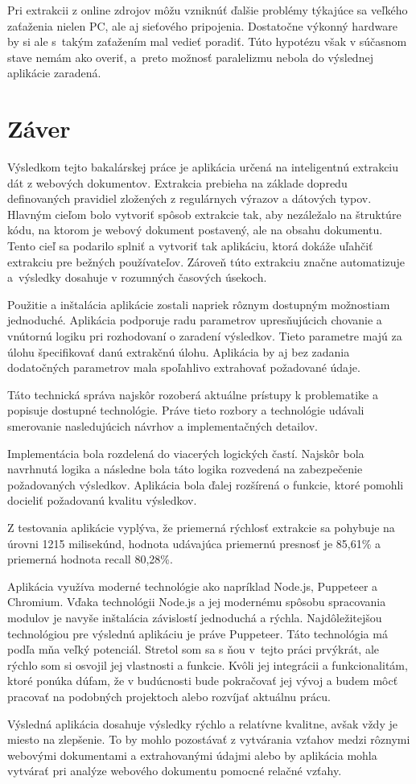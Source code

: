 Pri extrakcii z online zdrojov môžu vzniknúť ďalšie problémy týkajúce sa veľkého zaťaženia nielen PC, ale aj sieťového pripojenia. Dostatočne výkonný hardware by si ale s~takým zaťažením mal vedieť poradiť. Túto hypotézu však v súčasnom stave nemám ako overiť, a~preto možnosť paralelizmu nebola do výslednej aplikácie zaradená.


\chapter{Záver}

Výsledkom tejto bakalárskej práce je aplikácia určená na inteligentnú extrakciu dát z webových dokumentov. Extrakcia prebieha na základe dopredu definovaných pravidiel zložených z regulárnych výrazov a dátových typov. Hlavným cieľom bolo vytvoriť spôsob extrakcie tak, aby nezáležalo na štruktúre kódu, na ktorom je webový dokument postavený, ale na obsahu dokumentu. Tento cieľ sa podarilo splniť a vytvoriť tak aplikáciu, ktorá dokáže uľahčiť extrakciu pre bežných používateľov. Zároveň túto extrakciu značne automatizuje a~výsledky dosahuje v rozumných časových úsekoch.

Použitie a inštalácia aplikácie zostali napriek rôznym dostupným možnostiam jednoduché. Aplikácia podporuje radu parametrov upresňujúcich chovanie a vnútornú logiku pri rozhodovaní o zaradení výsledkov. Tieto parametre majú za úlohu špecifikovať danú extrakčnú úlohu. Aplikácia by aj bez zadania dodatočných parametrov mala spoľahlivo extrahovať požadované údaje.

Táto technická správa najskôr rozoberá aktuálne prístupy k problematike a popisuje dostupné technológie. Práve tieto rozbory a technológie udávali smerovanie nasledujúcich návrhov a implementačných detailov. 

Implementácia bola rozdelená do viacerých logických častí. Najskôr bola navrhnutá logika a následne bola táto logika rozvedená na zabezpečenie požadovaných výsledkov. Aplikácia bola ďalej rozšírená o funkcie, ktoré pomohli docieliť požadovanú kvalitu výsledkov.

Z testovania aplikácie vyplýva, že priemerná rýchlosť extrakcie sa pohybuje na úrovni 1215 milisekúnd, hodnota udávajúca priemernú presnosť je 85,61\% a priemerná hodnota recall 80,28\%. 

Aplikácia využíva moderné technológie ako napríklad Node.js, Puppeteer a Chromium. Vďaka technológii Node.js a jej modernému spôsobu spracovania modulov je navyše inštalácia závislostí jednoduchá a rýchla. Najdôležitejšou technológiou pre výslednú aplikáciu je práve Puppeteer. Táto technológia má podľa mňa veľký potenciál. Stretol som sa s ňou v~tejto práci prvýkrát, ale rýchlo som si osvojil jej vlastnosti a funkcie. Kvôli jej integrácii a funkcionalitám, ktoré ponúka dúfam, že v budúcnosti bude pokračovať jej vývoj a budem môcť pracovať na podobných projektoch alebo rozvíjať aktuálnu prácu.

Výsledná aplikácia dosahuje výsledky rýchlo a relatívne kvalitne, avšak vždy je miesto na zlepšenie. To by mohlo pozostávať z vytvárania vzťahov medzi rôznymi webovými dokumentami a extrahovanými údajmi alebo by aplikácia mohla vytvárať pri analýze webového dokumentu pomocné relačné vzťahy.
